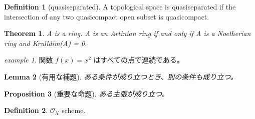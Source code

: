 \documentclass{article}
\theoremstyle{definition} %
\newtheorem{definition}{Definition}[section] %
\theoremstyle{plain} %
\newtheorem{theorem}{Theorem}[section]   %
\newtheorem{lemma}[theorem]{Lemma}     %
\newtheorem{proposition}[theorem]{Proposition} %
\theoremstyle{remark} %
\newtheorem{example}{example}[section]     %
\begin{document}
\begin{definition}[quasiseparated]
  A topological space is quasiseparated if the intersection of any two quasicompact open subset is quasicompact.
\end{definition}

\begin{theorem}
  A is a ring. A is an Artinian ring if and only if A is a Noetherian ring and Krulldim(A) = 0.
\end{theorem}

\begin{example}
関数 $f(x) = x^2$ はすべての点で連続である。
\end{example}

\begin{lemma}[有用な補題]
ある条件が成り立つとき、別の条件も成り立つ。
\end{lemma}

\begin{proposition}[重要な命題]
ある主張が成り立つ。
\end{proposition}

\begin{definition}
$\mathcal{O}_X$ scheme.
\end{definition}
\end{document}
